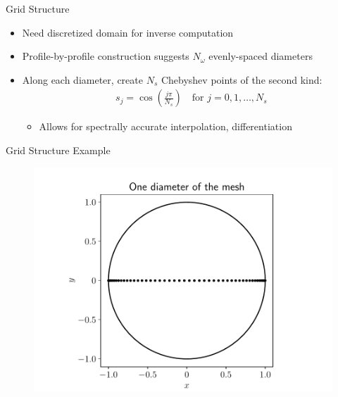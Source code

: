 \documentclass{beamer}
\begin{document}
\begin{frame}{Grid Structure}
\begin{itemize}
    \item
        Need discretized domain for inverse computation
    \item
        Profile-by-profile construction suggests $N_\omega$ evenly-spaced diameters
    \item
        Along each diameter, create $N_s$ Chebyshev points of the second kind:
    \begin{align*}
        s_j = \cos \left( \frac{j\pi}{N_s} \right) \quad \text{for $j = 0, 1, \dots, N_s$}
    \end{align*}
    \begin{itemize}
        \item Allows for spectrally accurate interpolation, differentiation
    \end{itemize}
\end{itemize}
\end{frame}

\begin{frame}{Grid Structure Example}
    \begin{figure}[H]
        \centering
        \includegraphics[scale=0.55]{figures/one_diameter.pdf}
    \end{figure}
\end{frame}
\end{document}
